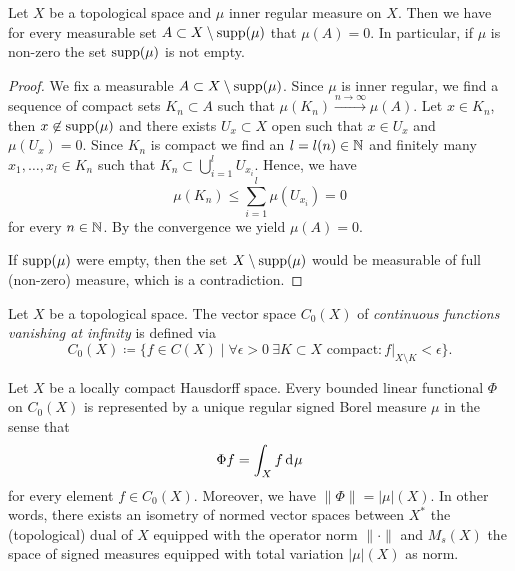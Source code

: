 \begin{lemma}
  \label{lem:mu-supp}
  Let \(X\) be a topological space and \(\mu\) inner regular measure on \(X\). Then we have for every measurable set \(A \subset X \setminus \operatorname{supp}(\mu)\) that \(\mu(A) = 0\). In particular, if \(\mu\) is non-zero the set \(\operatorname{supp}(\mu)\) is not empty.
\end{lemma}

\begin{proof}
  We fix a measurable \(A \subset X \setminus \operatorname{supp}(\mu)\). Since \(\mu\) is inner regular, we find a sequence of compact sets \(K_n \subset A\) such that \(\mu(K_n) \xrightarrow{n \to \infty} \mu(A)\). Let \(x \in K_n\), then \(x \not \in \operatorname{supp}(\mu)\) and there exists \(U_x \subset X\) open such that \(x \in U_x\) and \(\mu(U_x) = 0\). Since \(K_n\) is compact we find an \(l = l(n) \in \mathbb{N}\) and finitely many \(x_1, \dots, x_l \in K_n\) such that \(K_n \subset \bigcup_{i=1}^l U_{x_i}\). Hence, we have
  \[
    \mu(K_n) \leq \sum_{i=1}^l \mu(U_{x_i}) = 0
  \]
  for every \(n \in \mathbb{N}\). By the convergence we yield \(\mu(A) = 0\).

  If \(\operatorname{supp}(\mu)\) were empty, then the set \(X \setminus \operatorname{supp}(\mu)\) would be measurable of full (non-zero) measure, which is a contradiction.
\end{proof}

\begin{defin}
  \label{def:vanishing}
  Let \(X\) be a topological space. The vector space \(C_0(X)\) of \emph{continuous functions vanishing at infinity} is defined via
  \[
    C_0(X) \coloneqq \{f \in C(X) \mid \forall \epsilon > 0\ \exists K \subset X \text{ compact}\colon f|_{X\setminus K} < \epsilon\}.
  \]
\end{defin}

\begin{thm}
  \label{thm:riesz-markow}
  Let \(X\) be a locally compact Hausdorff space. Every bounded linear functional \(\Phi\) on \(C_0(X)\) is represented by a unique regular signed Borel measure \(\mu\) in the sense that \[
    \Phi f = \int_X f \d\mu
  \]
  for every element \(f \in C_0(X)\). Moreover, we have \(\|\Phi\| = |\mu|(X)\). In other words, there exists an isometry of normed vector spaces between \(X^\ast\) the (topological) dual of \(X\) equipped with the operator norm \(\|\cdot \|\) and \(M_{s}(X)\) the space of signed measures equipped with total variation \(|\mu|(X)\) as norm.
\end{thm}

